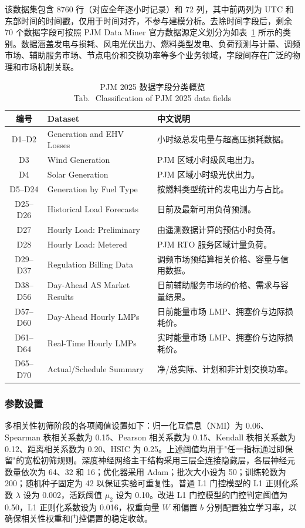 \documentclass[UTF8,zihao=5,twoside]{ctexart}
\numberwithin{equation}{section}
\newcommand{\tabbicaption}[2]{%
  \caption{#1\\[-0.2em]\small Tab.\,\thetable\ #2}
}
\begin{document}
该数据集包含 8760 行（对应全年逐小时记录）和 72 列，其中前两列为 UTC 和东部时间的时间戳，仅用于时间对齐，不参与建模分析。去除时间字段后，剩余 70 个数据字段可按照 PJM Data Miner 官方数据源定义划分为如表~\ref{tab:data_overview} 所示的类别。数据涵盖发电与损耗、风电光伏出力、燃料类型发电、负荷预测与计量、调频市场、辅助服务市场、节点电价和交换功率等多个业务领域，字段间存在广泛的物理和市场机制关联。

\begin{table}[!tbp]
\centering
\scriptsize
\setlength{\tabcolsep}{2pt}
\tabbicaption{PJM 2025 数据字段分类概览}{Classification of PJM 2025 data fields}
\label{tab:data_overview}
\begin{tabularx}{\columnwidth}{c>{\raggedright\arraybackslash}p{}X}
\toprule
编号 & Dataset & 中文说明 \\
\midrule
D1--D2 & Generation and EHV Losses & 小时级总发电量与超高压损耗数据。 \\
D3 & Wind Generation & PJM 区域小时级风电出力。 \\
D4 & Solar Generation & PJM 区域小时级光伏出力。 \\
D5--D24 & Generation by Fuel Type & 按燃料类型统计的发电出力与占比。 \\
D25--D26 & Historical Load Forecasts & 日前及最新可用负荷预测。 \\
D27 & Hourly Load: Preliminary & 由遥测数据计算的预估小时负荷。 \\
D28 & Hourly Load: Metered & PJM RTO 服务区域计量负荷。 \\
D29--D37 & Regulation Billing Data & 调频市场预结算相关价格、容量与信用数据。 \\
D38--D56 & Day-Ahead AS Market Results & 日前辅助服务市场的价格、需求与容量结果。 \\
D57--D60 & Day-Ahead Hourly LMPs & 日前能量市场 LMP、拥塞价与边际损耗价。 \\
D61--D64 & Real-Time Hourly LMPs & 实时能量市场 LMP、拥塞价与边际损耗价。 \\
D65--D70 & Actual/Schedule Summary & 净/总实际、计划和非计划交换功率。 \\
\bottomrule
\end{tabularx}
\end{table}

\subsubsection{参数设置}
多相关性初筛阶段的各项阈值设置如下：归一化互信息（NMI）为 0.06、Spearman 秩相关系数为 0.15、Pearson 相关系数为 0.15、Kendall 秩相关系数为 0.12、距离相关系数为 0.20、HSIC 为 0.25。上述阈值均用于"任一指标通过即保留"的宽松初筛规则。深度神经网络主干结构采用三层全连接隐藏层，各层神经元数量依次为 64、32 和 16；优化器采用 Adam；批次大小设为 50；训练轮数为 200；随机种子固定为 42 以保证实验可重复性。普通 L1 门控模型的 L1 正则化系数 $\lambda$ 设为 0.002，活跃阈值 $\mu_2$ 设为 0.10。改进 L1 门控模型的门控判定阈值为 0.50，L1 正则化系数设为 0.016，权重向量 $W$ 和偏置 $b$ 分别配置独立学习率，以确保相关性权重和门控偏置的稳定收敛。
\end{document}

